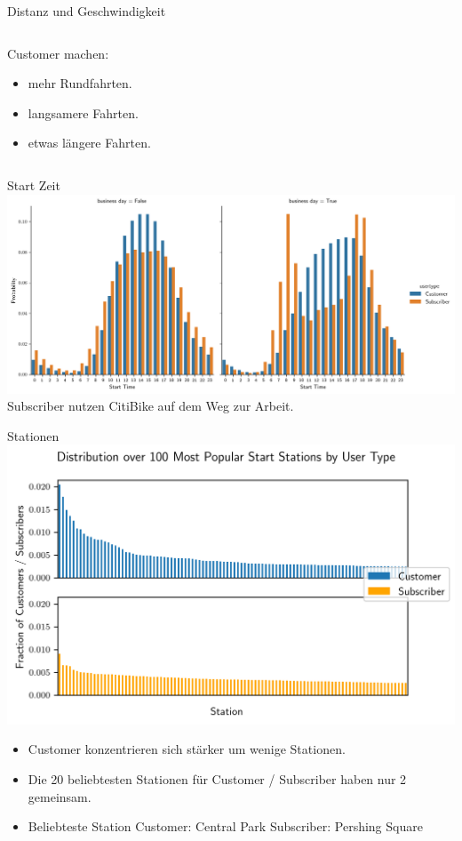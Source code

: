 \begin{frame}{Distanz und Geschwindigkeit}
\begin{columns}
\begin{column}{0.5\linewidth }
{
Customer machen:
\begin{itemize}
\item mehr Rundfahrten.
\item langsamere Fahrten.
\item etwas längere Fahrten.
\end{itemize}
}
\end{column}
\end{columns}
\end{frame}

\begin{frame}{Start Zeit}
\centering
\includegraphics[height=0.6\textheight]{../Images/StartTimeByBusiness}
{
Subscriber nutzen CitiBike auf dem Weg zur Arbeit.
}
\end{frame}

\begin{frame}{Stationen}
\centering
\includegraphics[height=0.6\textheight]{../Images/StartStationPopularity}
{
\begin{itemize}
\item Customer konzentrieren sich stärker um wenige Stationen.
\item Die 20 beliebtesten Stationen für Customer / Subscriber haben nur 2 gemeinsam.
\item Beliebteste Station Customer: Central Park \hspace{1cm} Subscriber: Pershing Square
\end{itemize}
}
\end{frame}

